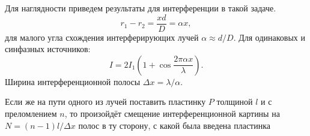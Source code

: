 \begin{minipage}{0.55\textwidth}
    Для наглядности приведем результаты для интерференции в такой задаче.
    \begin{equation*}
    	r_1 - r_2 = \frac{x d}{D} = \alpha x,
    \end{equation*}
    для малого угла схождения интерферирующих лучей $\alpha \approx d/D$. Для одинаковых и синфазных источников:
    \begin{equation*}
    	I = 2 I_1\left(1 + \cos \frac{2 \pi \alpha x}{\lambda}\right).
    \end{equation*}
    Ширина  интерференционной полосы $\Delta x = \lambda / \alpha$.

    Если же на пути одного из лучей поставить пластинку $P$ толщиной $l$ и с преломлением $n$, то произойдёт смещение интерференционной картины на $N = (n-1)l /\Delta x$ полос в ту сторону, с какой была введена пластинка
\end{minipage}











